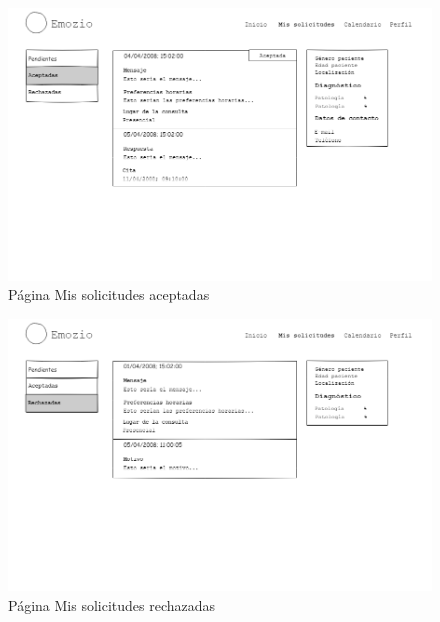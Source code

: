 \begin{figure}[htbp] 
    \centering
    \includegraphics[width=1\textwidth]{figuras/mockup_psicologos/mailaceptadas.png}
    \caption{Página Mis solicitudes aceptadas}
\end{figure}	

\begin{figure}[htbp] 
    \centering
    \includegraphics[width=1\textwidth]{figuras/mockup_psicologos/mailrechazadas.png}
    \caption{Página Mis solicitudes rechazadas}
\end{figure}	

